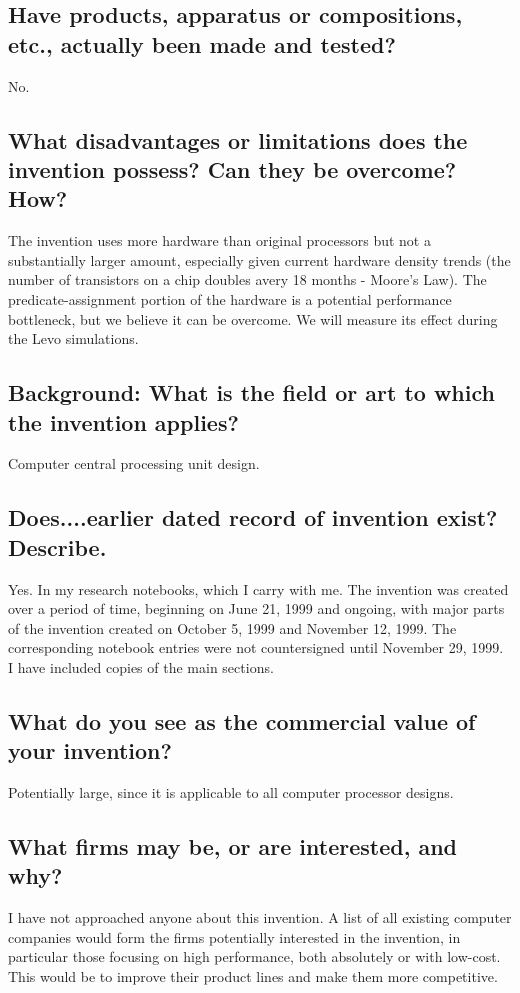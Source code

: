 \documentclass[10pt,dvips]{article}
\begin{document}
\subsection{Have products, apparatus or compositions, etc., actually been made and tested?}
No.

\subsection{What disadvantages or limitations does the invention possess?
Can they be overcome? How?}
The invention uses more hardware than original processors
but not a substantially larger amount, especially
given current hardware density trends (the number of transistors on a chip doubles
avery 18 months - Moore's Law). The predicate-assignment portion of the hardware
is a potential performance bottleneck, but we believe it can be overcome. We will
measure its effect during the Levo simulations.

\subsection{Background: What is the field or art to which the invention applies?}
Computer central processing unit design.

\subsection{Does....earlier dated record of invention exist? Describe.}
Yes. In my research notebooks, which I carry with me. The invention was created
over a period of time, beginning on June 21, 1999 and ongoing, with major parts of
the invention created on October 5, 1999 and November 12, 1999. The corresponding
notebook entries were not countersigned until November 29, 1999. I have included
copies of the main sections.

\subsection{What do you see as the commercial value of your invention?}
Potentially large, since it is applicable to all computer processor designs.

\subsection{What firms may be, or are interested, and why?}
I have not approached anyone about this invention. A list of all
existing computer
companies would form the firms potentially interested in the invention, in particular those
focusing on high performance, both absolutely or with low-cost.
This would be to improve their product lines
and make them more competitive.
\end{document}

